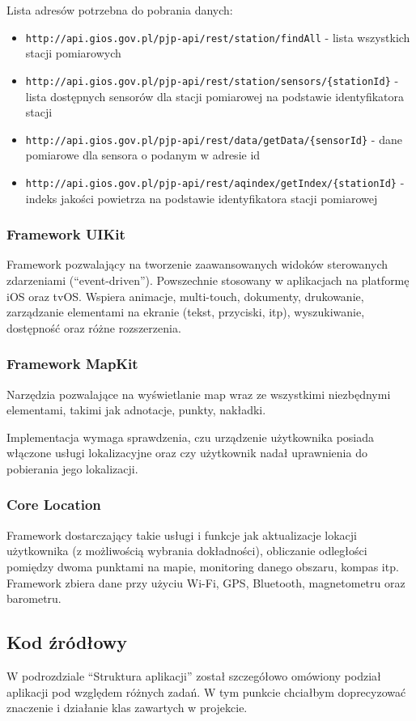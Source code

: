 \documentclass[a4paper,11pt,titlepage]{article}
\begin{document}
Lista adresów potrzebna do pobrania danych:
\begin{itemize}
 	\item \verb|http://api.gios.gov.pl/pjp-api/rest/station/findAll| - lista wszystkich stacji pomiarowych
	\item \verb|http://api.gios.gov.pl/pjp-api/rest/station/sensors/{stationId}| - lista dostępnych sensorów dla stacji pomiarowej na podstawie identyfikatora stacji
	\item \verb|http://api.gios.gov.pl/pjp-api/rest/data/getData/{sensorId}| - dane pomiarowe dla sensora o podanym w adresie id
	\item \verb|http://api.gios.gov.pl/pjp-api/rest/aqindex/getIndex/{stationId}| - indeks jakości powietrza na podstawie identyfikatora stacji pomiarowej
\end{itemize}
\subsubsection{Framework UIKit}
Framework pozwalający na tworzenie zaawansowanych widoków sterowanych zdarzeniami (``event-driven''). Powszechnie stosowany w aplikacjach na platformę iOS oraz tvOS. Wspiera animacje, multi-touch, dokumenty, drukowanie, zarządzanie elementami na ekranie (tekst, przyciski, itp), wyszukiwanie, dostępność oraz różne rozszerzenia.


\subsubsection{Framework MapKit}
Narzędzia pozwalające na wyświetlanie map wraz ze wszystkimi niezbędnymi elementami, takimi jak adnotacje, punkty, nakładki.

Implementacja wymaga sprawdzenia, czu urządzenie użytkownika posiada włączone usługi lokalizacyjne oraz czy użytkownik nadał uprawnienia do pobierania jego lokalizacji.

\subsubsection{Core Location}
Framework dostarczający takie usługi i funkcje jak aktualizacje lokacji użytkownika (z możliwością wybrania dokładności), obliczanie odległości pomiędzy dwoma punktami na mapie, monitoring danego obszaru, kompas itp. Framework zbiera dane przy użyciu Wi-Fi, GPS, Bluetooth, magnetometru oraz barometru.

\subsection{Kod źródłowy}
W podrozdziale ``Struktura aplikacji'' został szczegółowo omówiony podział aplikacji pod względem różnych zadań. W tym punkcie chciałbym doprecyzować znaczenie i działanie klas zawartych w projekcie.
\end{document}
